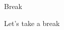 

\begin{frame}{Break}
\fontsize{36pt}{36pt}\selectfont
\center
\begin{center}
Let's take a break
\end{center}
\end{frame}

